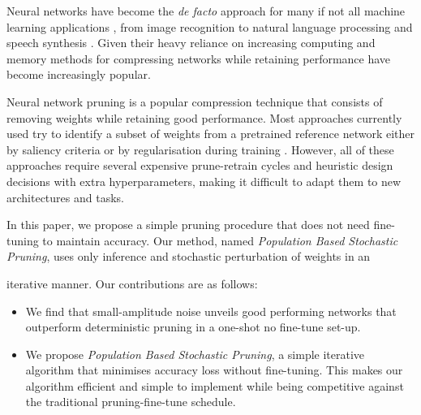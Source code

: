
    Neural networks have become the \textit{de facto} approach for many if not
    all machine learning applications \cite{lecunDeepLearning2015}, from  image
    recognition \cite{dengImageNetLargescaleHierarchical2009} to natural language
    processing \cite{devlinBERTPretrainingDeep2019} and  
    speech synthesis \cite{oordWaveNetGenerativeModel2016}.
    Given their heavy reliance on increasing computing and memory
    \cite{brownLanguageModelsAre2020,thompsonComputationalLimitsDeep2020}
    methods for compressing networks while retaining performance have become
    increasingly popular.

Neural network pruning is a popular compression technique that consists of removing weights while retaining good performance.
Most approaches currently used try to identify a subset of weights from a
pretrained reference network either by saliency criteria
\cite{mozerSkeletonizationTechniqueTrimming1988,
hassibiSecondOrderDerivatives1992,lecunOptimalBrainDamage1989} or by
regularisation during training
\cite{chauvinBackPropagationAlgorithmOptimal1988,
carreira-perpinanLearningCompressionAlgorithmsNeural2018}. However, all of these approaches require several expensive prune-retrain cycles and heuristic
design decisions with extra hyperparameters, making it difficult to adapt them
to new architectures and tasks.

In this paper, we propose a simple pruning procedure that does not need
fine-tuning to maintain accuracy. Our method, named \textit{Population Based
            Stochastic Pruning}, uses only inference and stochastic perturbation of weights in an
            
iterative manner.
Our contributions are as follows:
     \begin{itemize}
         \item We find that small-amplitude noise unveils good performing
             networks that outperform deterministic pruning in a one-shot no
             fine-tune set-up.
        \item  We propose \textit{Population Based
            Stochastic Pruning}, a simple iterative algorithm that minimises accuracy loss without
            fine-tuning. This makes our algorithm efficient and simple to
            implement while being competitive against the traditional
            pruning-fine-tune schedule.



     \end{itemize}
     
